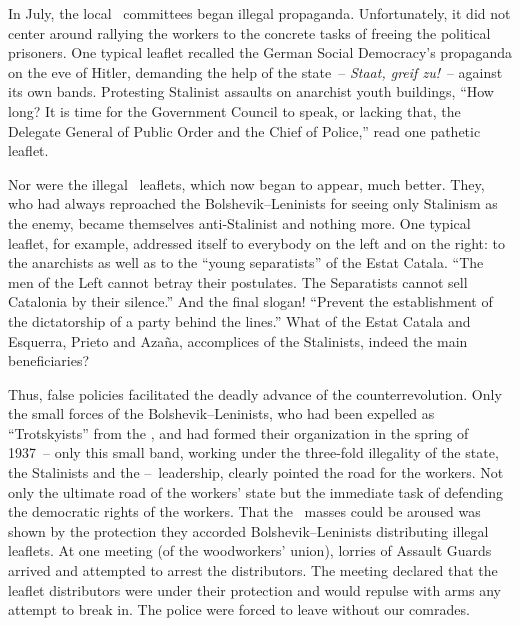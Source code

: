 In July\kn, the local \FAI\ committees began illegal propaganda. Unfortunately\kn, it did not center around rallying the workers to the concrete tasks of freeing the political prisoners. One typical leaflet recalled the German Social Democracy’s propaganda on the eve of Hitler\kn, demanding the help of the state~-- \emph{Staat, greif zu!}~-- against its own bands. Protesting Stalinist assaults on anarchist youth buildings, ``How long? It is time for the Government Council to speak, or lacking that, the Delegate General of Public Order and the Chief of Police,\kn\kn'' read one pathetic leaflet.

Nor were the illegal \POUM\ leaflets, which now began to appear\kn, much better. They, who had always reproached the Bolshevik--Len\-in\-ists for seeing only Stalinism as the enemy, became themselves anti-Stalinist and nothing more. One typical leaflet, for example, addressed itself to everybody on the left and on the right: to the anarchists as well as to the ``young separatists'' of the Estat Catala. ``The men of the Left cannot betray their postulates. The Separatists cannot sell Catalonia by their silence.\kn\kn'' And the final slogan! ``Prevent the establishment of the dictatorship of a party behind the lines.\kn\kn'' What of the Estat Catala and Esquerra, Prieto and Azaña, accomplices of the Stalinists, indeed the main beneficiaries?

Thus, false policies facilitated the deadly advance of the counterrevolution. Only the small forces of the Bolshevik--Leninists, who had been expelled as ``Trotskyists'' from the \POUM\kn, and had formed their organization in the spring of 1937~-- only this small band, working under the three-fold illegality of the state, the Stalinists and the \CNT--\POUM\ leadership, clearly pointed the road for the workers. Not only the ultimate road of the workers’ state but the immediate task of defending the democratic rights of the workers. That the \CNT\ masses could be aroused was shown by the protection they accorded Bolshevik--Leninists distributing illegal leaflets. At one meeting (of the woodworkers’ union), lorries of Assault Guards arrived and attempted to arrest the distributors. The meeting declared that the leaflet distributors were under their protection and would repulse with arms any attempt to break in. The police were forced to leave without our comrades.

